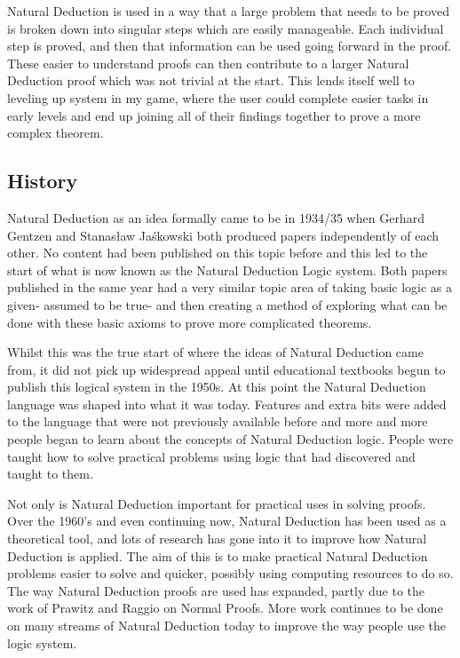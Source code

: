 \documentclass[a4paper]{article}
\begin{document}
Natural Deduction is used in a way that a large problem that needs to be proved is broken down into singular steps which are easily manageable. Each individual step is proved, and then that information can be used going forward in the proof. \cite{LogicND} These easier to understand proofs can then contribute to a larger Natural Deduction proof which was not trivial at the start. This lends itself well to leveling up system in my game, where the user could complete easier tasks in early levels and end up joining all of their findings together to prove a more complex theorem. 

\subsection{History}

Natural Deduction as an idea formally came to be in 1934/35 when Gerhard Gentzen and Stanas\l{}aw Ja{\'s}kowski both produced papers independently of each other. \cite{jaskowski1934rules} \cite{1964} No content had been published on this topic before and this led to the start of what is now known as the Natural Deduction Logic system. Both papers published in the same year had a very similar topic area of taking basic logic as a given- assumed to be true- and then creating a method of exploring what can be done with these basic axioms to prove more complicated theorems.  \cite{BriefHistory}

Whilst this was the true start of where the ideas of Natural Deduction came from, it did not pick up widespread appeal until educational textbooks begun to publish this logical system in the 1950s.  \cite{BriefHistory} At this point the Natural Deduction language was shaped into what it was today. Features and extra bits were added to the language that were not previously available before and more and more people began to learn about the concepts of Natural Deduction logic. People were taught how to solve practical problems using logic that had discovered and taught to them.

Not only is Natural Deduction important for practical uses in solving proofs. Over the 1960's and even continuing now, Natural Deduction has been used as a theoretical tool, and lots of research has gone into it to improve how Natural Deduction is applied. The aim of this is to make practical Natural Deduction problems easier to solve and quicker, possibly using computing resources to do so. The way Natural Deduction proofs are used has expanded, partly due to the work of Prawitz and Raggio on Normal Proofs. \cite{philNadDed}  More work continues to be done on many streams of Natural Deduction today to improve the way people use the logic system.
\end{document}
